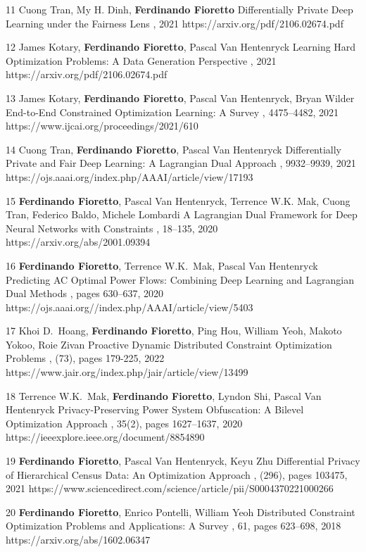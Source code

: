 \documentclass[localFont,alternative]{documentMETADATA}
\begin{document}
\begin{pubs}
	\confentryShort 
	{11} %
	{{Cuong Tran}, {My H. Dinh}, {\bf Ferdinando Fioretto}}
	{Differentially Private Deep Learning under the Fairness Lens}
	{\procNeurIPS, 2021}
	{https://arxiv.org/pdf/2106.02674.pdf}

	\confentryShort 
	{12} %
	{{James Kotary}, {\bf Ferdinando Fioretto}, Pascal Van Hentenryck}
	{Learning Hard Optimization Problems: A Data Generation Perspective}
	{\procNeurIPS, 2021}
	{https://arxiv.org/pdf/2106.02674.pdf}

	\confentryShort 
	{13} %
	{{James Kotary}, {\bf Ferdinando Fioretto}, Pascal Van Hentenryck, Bryan Wilder}
	{End-to-End Constrained Optimization Learning: A Survey}
	{\procIJCAI, 4475--4482, 2021}
	{https://www.ijcai.org/proceedings/2021/610}

	\confentryShort 
	{14} %
	{{Cuong Tran}, {\bf Ferdinando Fioretto}, Pascal Van Hentenryck}
	{Differentially Private and Fair Deep Learning: A Lagrangian Dual Approach}
	{\procAAAI, 9932--9939, 2021}
	{https://ojs.aaai.org/index.php/AAAI/article/view/17193}

	\confentryShort
		{15} %
		{{\bf Ferdinando Fioretto}, Pascal Van Hentenryck, Terrence W.K. Mak, {Cuong Tran}, Federico Baldo, Michele Lombardi} 
		{A Lagrangian Dual Framework for Deep Neural Networks with Constraints}
		{\procECML, 18--135, 2020}
		{https://arxiv.org/abs/2001.09394}

	
	\confentryShort
		{16} %
		{{\bf Ferdinando Fioretto}, Terrence W.K.~Mak, Pascal Van Hentenryck}
		{Predicting AC Optimal Power Flows: Combining Deep Learning and Lagrangian Dual Methods}
	  	{\procAAAI, pages 630--637, 2020}
	  	{https://ojs.aaai.org//index.php/AAAI/article/view/5403}

\confentryShort
	{17} %
	{Khoi D.~Hoang, \textbf{Ferdinando Fioretto}, Ping Hou, William Yeoh, Makoto Yokoo, Roie Zivan}
	{Proactive Dynamic Distributed Constraint Optimization Problems}
	{\JAIR, (73), pages 179-225, 2022}
	{https://www.jair.org/index.php/jair/article/view/13499}

	\confentryShort
	{18}	%
		{Terrence W.K.~Mak, {\bf Ferdinando Fioretto}, {Lyndon Shi}, Pascal Van Hentenryck}
		{Privacy-Preserving Power System Obfuscation: A Bilevel Optimization Approach}
		{\TPS, 35(2), pages 1627--1637, 2020}
		{https://ieeexplore.ieee.org/document/8854890}

	\confentryShort
	{19} %
		{\textbf{Ferdinando Fioretto}, Pascal Van Hentenryck, Keyu Zhu}
		{Differential Privacy of Hierarchical Census Data: An Optimization Approach}
		{\AIJ, (296), pages 103475, 2021}
		{https://www.sciencedirect.com/science/article/pii/S0004370221000266}

	\confentryShort
	{20}	%
		{{\bf Ferdinando Fioretto}, Enrico Pontelli, William Yeoh}
		{Distributed Constraint Optimization Problems and Applications: A Survey}
		{\JAIR, 61, pages 623--698, 2018} 
		{https://arxiv.org/abs/1602.06347}

\end{pubs}
\end{document}
